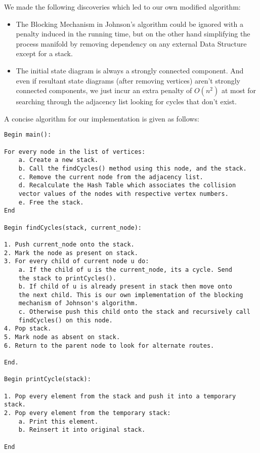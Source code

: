 \documentclass{article}
\begin{document}
We made the following discoveries which led to our own modified algorithm:
\begin{itemize}
    \item The Blocking Mechanism in Johnson's algorithm could be ignored with a penalty induced in the running time, but on the other hand simplifying the process manifold by removing dependency on any external Data Structure except for a stack.
    \item The initial state diagram is always a strongly connected component. And even if resultant state diagrams (after removing vertices) aren't strongly connected components, we just incur an extra penalty of $O(n^2)$ at most for searching through the adjacency list looking for cycles that don't exist.
\end{itemize}
A concise algorithm for our implementation is given as follows:


\begin{verbatim}
Begin main():
 	
For every node in the list of vertices:
    a. Create a new stack.
    b. Call the findCycles() method using this node, and the stack.
    c. Remove the current node from the adjacency list.
    d. Recalculate the Hash Table which associates the collision
    vector values of the nodes with respective vertex numbers.
    e. Free the stack.
End

Begin findCycles(stack, current_node):

1. Push current_node onto the stack.
2. Mark the node as present on stack.
3. For every child of current node u do:
    a. If the child of u is the current_node, its a cycle. Send
    the stack to printCycles().
    b. If child of u is already present in stack then move onto 
    the next child. This is our own implementation of the blocking
    mechanism of Johnson's algorithm.
    c. Otherwise push this child onto the stack and recursively call
    findCycles() on this node.
4. Pop stack.
5. Mark node as absent on stack.
6. Return to the parent node to look for alternate routes.

End.

Begin printCycle(stack):

1. Pop every element from the stack and push it into a temporary stack.
2. Pop every element from the temporary stack:
    a. Print this element.
    b. Reinsert it into original stack.

End



\end{verbatim}
\end{document}
